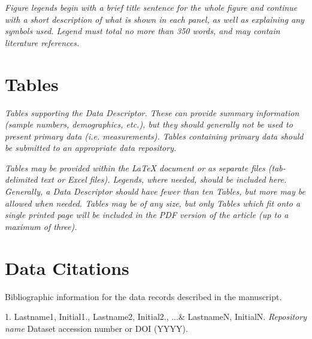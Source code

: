 \documentclass[english]{article}
\begin{document}
\emph{Figure legends begin with a brief title sentence for the whole figure
and continue with a short description of what is shown in each panel,
as well as explaining any symbols used. Legend must total no more
than 350 words, and may contain literature references.}

\section*{Tables}

\emph{Tables supporting the Data Descriptor. These can provide summary information
(sample numbers, demographics, etc.), but they should generally not
be used to present primary data (i.e. measurements). Tables containing
primary data should be submitted to an appropriate data repository.}

\emph{Tables may be provided within the \LaTeX{} document or as separate
files (tab-delimited text or Excel files). Legends, where needed,
should be included here. Generally, a Data Descriptor should have
fewer than ten Tables, but more may be allowed when needed. Tables
may be of any size, but only Tables which fit onto a single printed
page will be included in the PDF version of the article (up to a maximum
of three).}

{\small
}

%
%

\section*{Data Citations}

Bibliographic information for the data records described in the manuscript.

1. Lastname1, Initial1., Lastname2, Initial2., ...\& LastnameN, InitialN. \emph{Repository name} Dataset accession number or DOI (YYYY).
\end{document}

